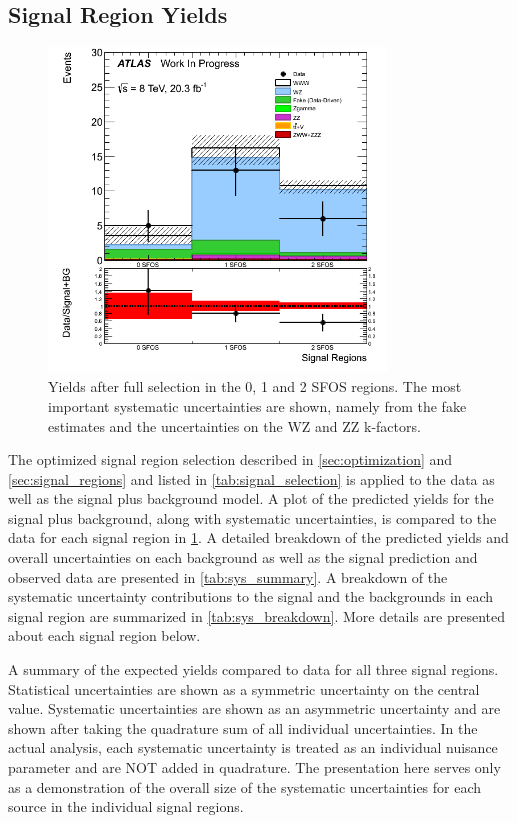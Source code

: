\subsection{Signal Region Yields}
\label{sec:signal_yield}
\begin{figure}[ht!]
\centering
\includegraphics[width=0.8\textwidth]{figures/SFOSSignalRegions.png}
\caption{Yields after full selection in the 0, 1 and 2 SFOS regions.  
The most important systematic uncertainties are shown, namely from the 
fake estimates and the uncertainties on the WZ and ZZ k-factors.}
\label{fig:sig_yields_nsfos}
\end{figure}

The optimized signal region selection
described in \sec\ref{sec:optimization} and \sec\ref{sec:signal_regions}
and listed in \tab\ref{tab:signal_selection} is applied 
to the data as well as the signal plus background model.
A plot of the predicted yields for the 
signal plus background, along with systematic uncertainties,
is compared to the data for each signal region
in \fig\ref{fig:sig_yields_nsfos}. A detailed 
breakdown of the predicted yields and overall uncertainties
on each background as well as the signal prediction and observed
data
are presented in \tab\ref{tab:sys_summary}.
A breakdown of the systematic uncertainty contributions
to the signal and the backgrounds in each signal region
are summarized in \tab\ref{tab:sys_breakdown}.
More details are presented about each signal region below.



\begin{table}[ht!]
\centering

\caption{A summary of the expected yields compared to data for all 
three signal regions.  Statistical uncertainties are shown 
as a symmetric uncertainty on the central value. Systematic uncertainties 
are shown as an asymmetric uncertainty and are shown
after taking the quadrature sum of all individual uncertainties. 
In the actual analysis, each systematic uncertainty is
treated as an individual nuisance parameter and are NOT added in quadrature.  
The presentation here serves only as a demonstration
of the overall size of the systematic uncertainties for each source in the 
individual signal regions.}
\label{tab:sys_summary}
\end{table}

